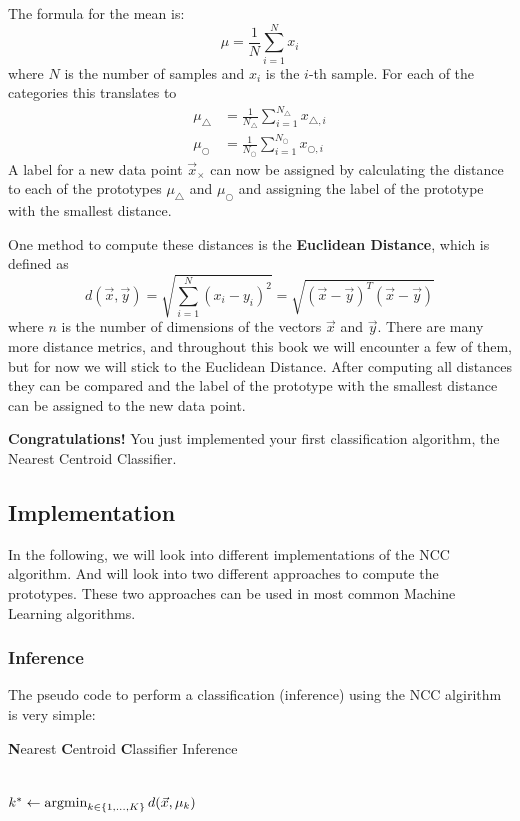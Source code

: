 \documentclass[a4paper]{article}
\newcommand{\argmin}{\operatornamewithlimits{argmin}}
\begin{document}
The formula for the mean is:
\begin{equation}
  \mu = \frac{1}{N} \sum_{i=1}^{N} x_i
  \label{eq:mean}
\end{equation}
where $N$ is the number of samples and $x_i$ is the $i$-th sample.
For each of the categories this translates to
\begin{align}
  \mu_\bigtriangleup &= \frac{1}{N_\bigtriangleup} \sum_{i=1}^{N_\bigtriangleup} x_{\bigtriangleup, i} \\
  \mu_\bigcirc &= \frac{1}{N_\bigcirc} \sum_{i=1}^{N_\bigcirc} x_{\bigcirc, i}
\end{align}
A label for a new data point $\vec{x}_{\times}$ can now be assigned by calculating the distance to each of the prototypes $\mu_{\bigtriangleup}$ and $\mu_{\bigcirc}$ and assigning the label of the prototype with the smallest distance.

One method to compute these distances is the \textbf{Euclidean Distance}, which is defined as
\begin{equation}
  d(\vec{x}, \vec{y}) = \sqrt{\sum_{i=1}^{N} (x_i - y_i)^2} = \sqrt{(\vec{x} - \vec{y})^T (\vec{x} - \vec{y})}
\end{equation}
where $n$ is the number of dimensions of the vectors $\vec{x}$ and $\vec{y}$.
There are many more distance metrics, and throughout this book we will encounter a few of them, but for now we will stick to the Euclidean Distance.
After computing all distances they can be compared and the label of the prototype with the smallest distance can be assigned to the new data point.

\textbf{Congratulations!} You just implemented your first classification algorithm, the Nearest Centroid Classifier.
\subsection{Implementation}
In the following, we will look into different implementations of the NCC algorithm. And will look into two different approaches to compute the prototypes.
These two approaches can be used in most common Machine Learning algorithms.

\subsubsection{Inference}
The pseudo code to perform a classification (inference) using the NCC algirithm is very simple:
\begin{algorithm}
\LinesNumbered
\caption{\textbf{N}earest \textbf{C}entroid \textbf{C}lassifier Inference}\label{alg:ncc}
\\
$k^* \gets \argmin_{k\in\{1,\dots,K\}} d(\vec{x}, \mu_k)$\;
\end{algorithm}
\end{document}
